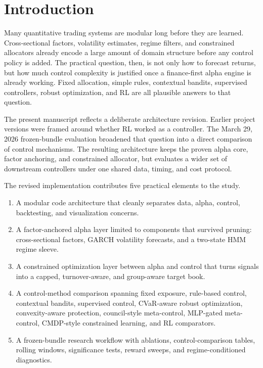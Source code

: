 \documentclass[11pt]{article}
\begin{document}
\section{Introduction}

Many quantitative trading systems are modular long before they are learned.
Cross-sectional factors, volatility estimates, regime filters, and constrained
allocators already encode a large amount of domain structure before any control
policy is added. The practical question, then, is not only how to forecast
returns, but how much control complexity is justified once a finance-first
alpha engine is already working. Fixed allocation, simple rules, contextual
bandits, supervised controllers, robust optimization, and RL are all plausible
answers to that question.

The present manuscript reflects a deliberate architecture revision. Earlier
project versions were framed around whether RL worked as a controller. The
March 29, 2026 frozen-bundle evaluation broadened that question into a direct
comparison of control mechanisms. The resulting architecture keeps the proven
alpha core, factor anchoring, and constrained allocator, but evaluates a wider
set of downstream controllers under one shared data, timing, and cost protocol.

The revised implementation contributes five practical elements to the study.
\begin{enumerate}[leftmargin=1.5em, itemsep=2pt, topsep=4pt]
\item A modular code architecture that cleanly separates data, alpha, control,
      backtesting, and visualization concerns.
\item A factor-anchored alpha layer limited to components that survived pruning:
      cross-sectional factors, GARCH volatility forecasts, and a two-state HMM
      regime sleeve.
\item A constrained optimization layer between alpha and control that turns
      signals into a capped, turnover-aware, and group-aware target book.
\item A control-method comparison spanning fixed exposure, rule-based control,
      contextual bandits, supervised control, CVaR-aware robust optimization,
      convexity-aware protection, council-style meta-control, MLP-gated
      meta-control, CMDP-style constrained learning, and RL comparators.
\item A frozen-bundle research workflow with ablations, control-comparison
      tables, rolling windows, significance tests, reward sweeps, and
      regime-conditioned diagnostics.
\end{enumerate}
\end{document}
